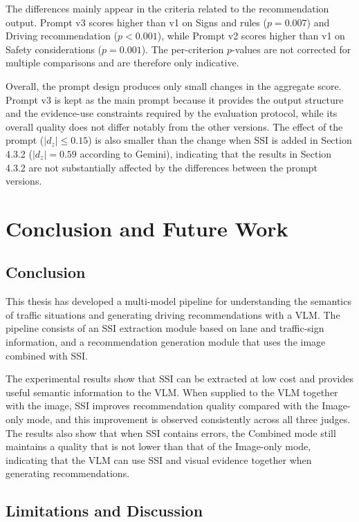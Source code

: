 \documentclass[12pt,a4paper]{report}
\begin{document}
The differences mainly appear in the criteria related to the recommendation output. Prompt v3 scores higher than v1 on Signs and rules ($p=0.007$) and Driving recommendation ($p<0.001$), while Prompt v2 scores higher than v1 on Safety considerations ($p=0.001$). The per-criterion $p$-values are not corrected for multiple comparisons and are therefore only indicative.

Overall, the prompt design produces only small changes in the aggregate score. Prompt v3 is kept as the main prompt because it provides the output structure and the evidence-use constraints required by the evaluation protocol, while its overall quality does not differ notably from the other versions. The effect of the prompt ($|d_z| \le 0.15$) is also smaller than the change when SSI is added in Section 4.3.2 ($|d_z|=0.59$ according to Gemini), indicating that the results in Section 4.3.2 are not substantially affected by the differences between the prompt versions.

\chapter{Conclusion and Future Work}

\section{Conclusion}

This thesis has developed a multi-model pipeline for understanding the semantics of traffic situations and generating driving recommendations with a VLM. The pipeline consists of an SSI extraction module based on lane and traffic-sign information, and a recommendation generation module that uses the image combined with SSI.

The experimental results show that SSI can be extracted at low cost and provides useful semantic information to the VLM. When supplied to the VLM together with the image, SSI improves recommendation quality compared with the Image-only mode, and this improvement is observed consistently across all three judges. The results also show that when SSI contains errors, the Combined mode still maintains a quality that is not lower than that of the Image-only mode, indicating that the VLM can use SSI and visual evidence together when generating recommendations.

\section{Limitations and Discussion}
\end{document}
